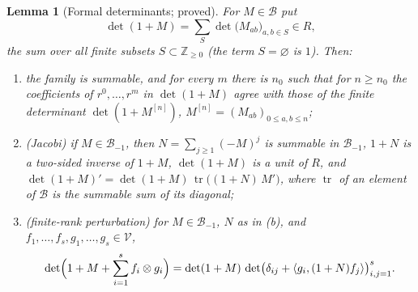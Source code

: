 \documentclass[11pt]{article}
\newtheorem{lemma}[theorem]{Lemma}
\theoremstyle{definition}
\theoremstyle{remark}
\newcommand{\Z}{\mathbb{Z}}
\newcommand{\tr}{\operatorname{tr}}
\begin{document}
\begin{lemma}[Formal determinants; proved]\label{lem:fred}
For $M\in\mathcal B$ put
\[
\det(1+M)=\sum_{S}\det\bigl(M_{ab}\bigr)_{a,b\in S}\in R,
\]
the sum over all finite subsets $S\subset\Z_{\ge0}$ (the term $S=\varnothing$ is $1$). Then:
\begin{enumerate}[label=(\alph*)]
\item the family is summable, and for every $m$ there is $n_0$ such that for $n\ge n_0$ the coefficients of $r^0,\dots,r^m$ in $\det(1+M)$ agree with those of the finite determinant $\det(1+M^{[n]})$, $M^{[n]}=(M_{ab})_{0\le a,b\le n}$;
\item (Jacobi) if $M\in\mathcal B_{-1}$, then $N=\sum_{j\ge1}(-M)^j$ is summable in $\mathcal B_{-1}$, $1+N$ is a two-sided inverse of $1+M$, $\det(1+M)$ is a unit of $R$, and $\det(1+M)'=\det(1+M)\,\tr\bigl((1+N)\,M'\bigr)$, where $\tr$ of an element of $\mathcal B$ is the summable sum of its diagonal;
\item (finite-rank perturbation) for $M\in\mathcal B_{-1}$, $N$ as in (b), and $f_1,\dots,f_s,g_1,\dots,g_s\in\mathcal V$,
\[
\det\Bigl(1+M+\sum_{i=1}^sf_i\otimes g_i\Bigr)=\det(1+M)\,\det\bigl(\delta_{ij}+\langle g_i,(1+N)f_j\rangle\bigr)_{i,j=1}^s .
\]
\end{enumerate}
\end{lemma}
\end{document}
